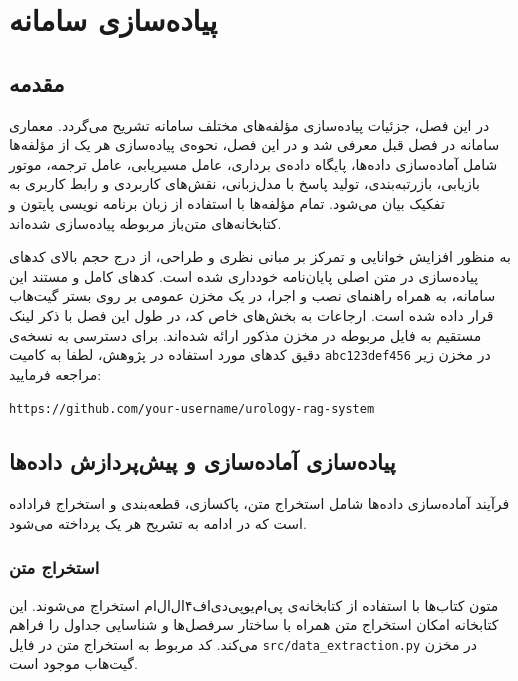 \chapter{پیاده‌سازی سامانه}\label{Chap:chap4}
{}

\section{مقدمه}

در این فصل، جزئیات پیاده‌سازی مؤلفه‌های مختلف سامانه‌ تشریح می‌گردد. معماری سامانه در فصل قبل معرفی شد و در این فصل، نحوه‌ی پیاده‌سازی هر یک از مؤلفه‌ها شامل آماده‌سازی داده‌ها، پایگاه داده‌ی برداری، عامل مسیریابی، عامل ترجمه، موتور بازیابی، بازرتبه‌بندی، تولید پاسخ با مدل‌زبانی، نقش‌های کاربردی و رابط کاربری به تفکیک بیان می‌شود. تمام مؤلفه‌ها با استفاده از زبان برنامه نویسی پایتون و کتابخانه‌های متن‌باز مربوطه پیاده‌سازی شده‌اند.


به منظور افزایش خوانایی و تمرکز بر مبانی نظری و طراحی، از درج حجم بالای کدهای پیاده‌سازی در متن اصلی پایان‌نامه خودداری شده است. کد‌های کامل و مستند این سامانه، به همراه راهنمای نصب و اجرا، در یک مخزن عمومی بر روی بستر گیت‌هاب قرار داده شده است. ارجاعات به بخش‌های خاص کد، در طول این فصل با ذکر لینک مستقیم به فایل مربوطه در مخزن مذکور ارائه شده‌اند. برای دسترسی به نسخه‌ی دقیق کد‌های مورد استفاده در پژوهش، لطفا به کامیت \texttt{abc123def456} در مخزن زیر مراجعه فرمایید:

\vspace{0.3cm}
\centerline{\texttt{https://github.com/your-username/urology-rag-system}}
\vspace{0.3cm}

\section{پیاده‌سازی آماده‌سازی و پیش‌پردازش داده‌ها}

فرآیند آماده‌سازی داده‌ها شامل استخراج متن، پاکسازی، قطعه‌بندی
 و استخراج فراداده
 است که در ادامه به تشریح هر یک پرداخته می‌شود.

\subsection{استخراج متن}

متون کتاب‌ها با استفاده از کتابخانه‌ی پی‌ام‌یو‌پی‌دی‌اف۴ال‌ال‌ام
استخراج می‌شوند. این کتابخانه امکان استخراج متن همراه با ساختار سرفصل‌ها و شناسایی جداول را فراهم می‌کند. کد مربوط به استخراج متن در فایل \texttt{src/data\_extraction.py} در مخزن گیت‌هاب موجود است.

